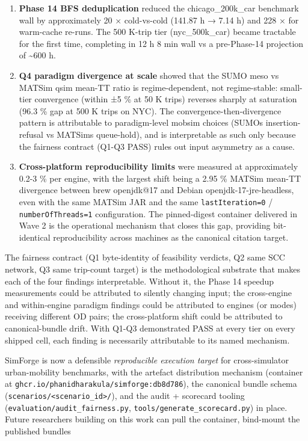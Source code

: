 \begin{enumerate}
\def\labelenumi{\arabic{enumi}.}
\item
  \textbf{Phase 14 BFS deduplication} reduced the chicago\_200k\_car
  benchmark wall by approximately 20 × cold-vs-cold (141.87 h → 7.14 h)
  and 228 × for warm-cache re-runs. The 500 K-trip tier (nyc\_500k\_car)
  became tractable for the first time, completing in 12 h 8 min wall vs
  a pre-Phase-14 projection of \textasciitilde600 h.
\item
  \textbf{Q4 paradigm divergence at scale} showed that the SUMO meso vs
  MATSim qsim mean-TT ratio is regime-dependent, not regime-stable:
  small-tier convergence (within ±5 \% at 50 K trips) reverses sharply
  at saturation (96.3 \% gap at 500 K trips on NYC). The
  convergence-then-divergence pattern is attributable to paradigm-level
  mobsim choices (SUMO\textquotesingle s insertion-refusal vs
  MATSim\textquotesingle s queue-hold), and is interpretable as such
  only because the fairness contract (Q1-Q3 PASS) rules out input
  asymmetry as a cause.
\item
  \textbf{Cross-platform reproducibility limits} were measured at
  approximately 0.2-3 \% per engine, with the largest shift being a 2.95
  \% MATSim mean-TT divergence between brew openjdk@17 and Debian
  openjdk-17-jre-headless, even with the same MATSim JAR and the same
  \texttt{lastIteration=0} / \texttt{numberOfThreads=1} configuration.
  The pinned-digest container delivered in Wave 2 is the operational
  mechanism that closes this gap, providing bit-identical
  reproducibility across machines as the canonical citation target.
\end{enumerate}

The fairness contract (Q1 byte-identity of feasibility verdicts, Q2 same
SCC network, Q3 same trip-count target) is the methodological substrate
that makes each of the four findings interpretable. Without it, the
Phase 14 speedup measurements could be attributed to silently changing
input; the cross-engine and within-engine paradigm findings could be
attributed to engines (or modes) receiving different OD pairs; the
cross-platform shift could be attributed to canonical-bundle drift. With
Q1-Q3 demonstrated PASS at every tier on every shipped cell, each
finding is necessarily attributable to its named mechanism.

SimForge is now a defensible \emph{reproducible execution target} for
cross-simulator urban-mobility benchmarks, with the artefact
distribution mechanism (container at
\texttt{ghcr.io/phanidharakula/simforge:db8d786}), the canonical bundle
schema (\texttt{scenarios/\textless{}scenario\_id\textgreater{}/}), and
the audit + scorecard tooling (\texttt{evaluation/audit\_fairness.py},
\texttt{tools/generate\_scorecard.py}) in place. Future researchers
building on this work can pull the container, bind-mount the published
bundles

